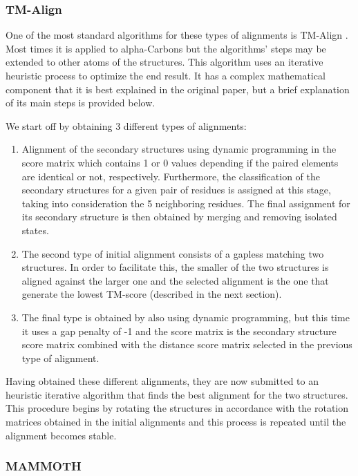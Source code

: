 \subsubsection{TM-Align}

One of the most standard algorithms for these types of alignments is TM-Align \cite{zhang2005tm}. Most times it is applied to alpha-Carbons but the algorithms' steps may be extended to other atoms of the structures. This algorithm uses an iterative heuristic process to optimize the end result. It has a complex mathematical component that it is best explained in the original paper, but a brief explanation of its main steps is provided below. 

We start off by obtaining 3 different types of alignments:

\begin{enumerate}
	\item Alignment of the secondary structures using dynamic programming in the score matrix which contains 1 or 0 values depending if the paired elements are identical or not, respectively. Furthermore, the classification of the secondary structures for a given pair of residues is assigned at this stage, taking into consideration the 5 neighboring residues. The final assignment for its secondary structure is then obtained by merging and removing isolated states.
	
	\item The second type of initial alignment consists of a gapless matching two structures. In order to facilitate this, the smaller of the two structures is aligned against the larger one and the selected alignment is the one that generate the lowest TM-score (described in the next section).
	
	\item The final type is obtained by also using dynamic programming, but this time it uses a gap penalty of -1 and the score matrix is the secondary structure score matrix combined with the distance score matrix selected in the previous type of alignment.
\end{enumerate}

Having obtained these different alignments, they are now submitted to an heuristic iterative algorithm that finds the best alignment for the two structures. This procedure begins by rotating the structures in accordance with the rotation matrices obtained in the initial alignments and this process is repeated until the alignment becomes stable.

\subsubsection{MAMMOTH}

